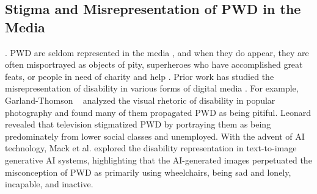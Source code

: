 

\subsection{Stigma and Misrepresentation of PWD in the Media}
\cite{kelly_AI24, ippolito2020misrepresentation, hall1997representation, young2014imnot}. PWD are seldom represented in the media \cite{darke2004changing}, and when they do appear, they are often misportrayed as objects of pity, superheroes who have accomplished great feats, or people in need of charity and help \cite{garlandthomson2002politics, quayson2007aesthetic, young2014imnot}. Prior work has studied the misrepresentation of disability in various forms of digital media \cite{garlandthomson2002politics, elliott1982media, kelly_AI24}. For example, Garland-Thomson ~\cite{garlandthomson2002politics} analyzed the visual rhetoric of disability in popular photography and found many of them propagated PWD as being pitiful. Leonard \cite{elliott1982media} revealed that television stigmatized PWD by portraying them as being predominately from lower social classes and unemployed. With the advent of AI technology, Mack et al. \cite{kelly_AI24} explored the disability representation in text-to-image generative AI systems, highlighting that the AI-generated images perpetuated the misconception of PWD as primarily using wheelchairs, being sad and lonely, incapable, and inactive.


